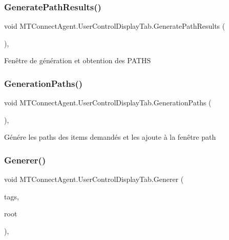 \subsubsection{\texorpdfstring{Generate\+Path\+Results()}{GeneratePathResults()}}
{\footnotesize\ttfamily void M\+T\+Connect\+Agent.\+User\+Control\+Display\+Tab.\+Generate\+Path\+Results (\begin{DoxyParamCaption}{ }\end{DoxyParamCaption})\hspace{0.3cm}{\ttfamily [inline]}, {\ttfamily [private]}}



Fenêtre de génération et obtention des P\+A\+T\+HS 

\mbox{\label{class_m_t_connect_agent_1_1_user_control_display_tab_ab942bfad7bf216e1b4915f0841d8c42f}} 
\subsubsection{\texorpdfstring{Generation\+Paths()}{GenerationPaths()}}
{\footnotesize\ttfamily void M\+T\+Connect\+Agent.\+User\+Control\+Display\+Tab.\+Generation\+Paths (\begin{DoxyParamCaption}{ }\end{DoxyParamCaption})\hspace{0.3cm}{\ttfamily [inline]}, {\ttfamily [private]}}



Génére les paths des items demandés et les ajoute à la fenêtre path 

\mbox{\label{class_m_t_connect_agent_1_1_user_control_display_tab_a936a17ca9a88c0cbab0e70894567cdad}} 
\subsubsection{\texorpdfstring{Generer()}{Generer()}}
{\footnotesize\ttfamily void M\+T\+Connect\+Agent.\+User\+Control\+Display\+Tab.\+Generer (\begin{DoxyParamCaption}\item[{I\+List$<$ \mbox{\hyperlink{class_m_t_connect_agent_1_1_model_1_1_tag}{Tag}} $>$}]{tags,  }\item[{Tree\+Node}]{root }\end{DoxyParamCaption})\hspace{0.3cm}{\ttfamily [inline]}, {\ttfamily [private]}}



